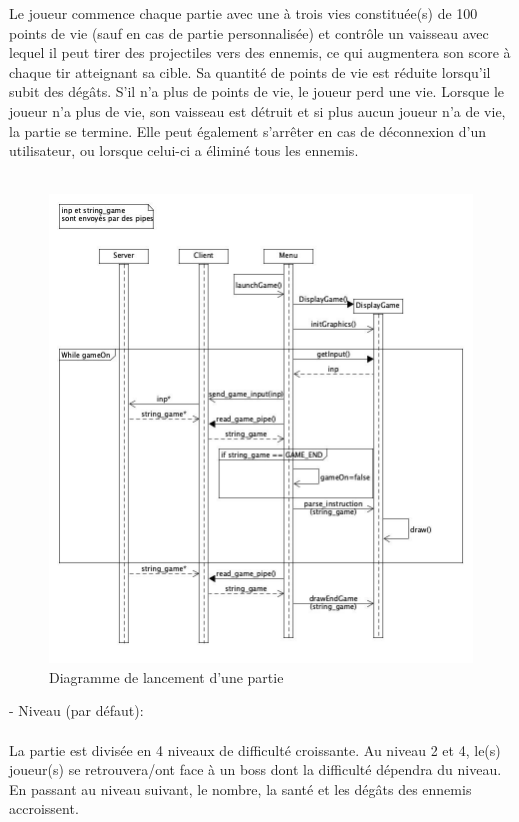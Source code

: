 \documentclass[a4paper,12pt]{article}
\begin{document}
Le joueur commence chaque partie avec une à trois vies constituée(s) de 100 points de vie (sauf en cas de partie personnalisée) et
contrôle un vaisseau avec lequel il peut tirer des projectiles vers des ennemis, ce qui 
augmentera son score à chaque tir atteignant sa cible. Sa quantité de points de vie est réduite
lorsqu’il subit des dégâts. S’il n’a plus de points de vie, le joueur perd une vie. Lorsque le 
joueur n’a plus de vie, son vaisseau est détruit et si plus aucun joueur n’a de vie, la partie se 
termine. Elle peut également s’arrêter en cas de déconnexion d’un utilisateur, ou lorsque celui-ci a éliminé tous les ennemis.\\
\\
\begin{figure}
\centering
\includegraphics[scale=0.5]{SRD/images/launch_game_sequence_diagram.jpg}
\caption{Diagramme de lancement d'une partie}
\end{figure}


- Niveau (par défaut):\\ \\
La partie est divisée en 4 niveaux de difficulté croissante. Au niveau 2 et 4, le(s) joueur(s) se retrouvera/ont face à un boss dont la difficulté dépendra du niveau. En passant au niveau suivant, le nombre, la santé et 
les dégâts des ennemis accroissent.\\
\end{document}
